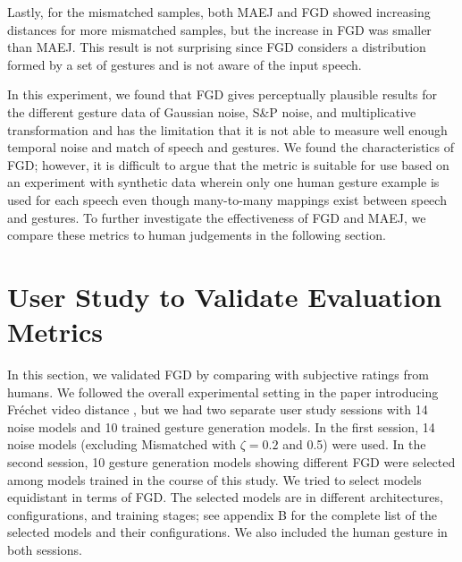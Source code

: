 \documentclass[acmtog]{acmart}
\begin{document}
Lastly, for the mismatched samples, both MAEJ and FGD showed increasing distances for more mismatched samples, but the increase in FGD was smaller than MAEJ. This result is not surprising since FGD considers a distribution formed by a set of gestures and is not aware of the input speech.

In this experiment, we found that FGD gives perceptually plausible results for the different gesture data of Gaussian noise, S\&P noise, and multiplicative transformation and has the limitation that it is not able to measure well enough temporal noise and match of speech and gestures. We found the characteristics of FGD; however, it is difficult to argue that the metric is suitable for use based on an experiment with synthetic data wherein only one human gesture example is used for each speech even though many-to-many mappings exist between speech and gestures. To further investigate the effectiveness of FGD and MAEJ, we compare these metrics to human judgements in the following section.

\section{User Study to Validate Evaluation Metrics} \label{sec:human_evaluation}

In this section, we validated FGD by comparing with subjective ratings from humans. We followed the overall experimental setting in the paper introducing Fr\'{e}chet video distance \cite{unterthiner2018towards}, but we had two separate user study sessions with 14 noise models and 10 trained gesture generation models. In the first session, 14 noise models (excluding Mismatched with $\zeta=0.2$ and 0.5) were used. In the second session, 10 gesture generation models showing different FGD were selected among models trained in the course of this study. We tried to select models equidistant in terms of FGD. The selected models are in different architectures, configurations, and training stages; see appendix B for the complete list of the selected models and their configurations. We also included the human gesture in both sessions.
\end{document}
